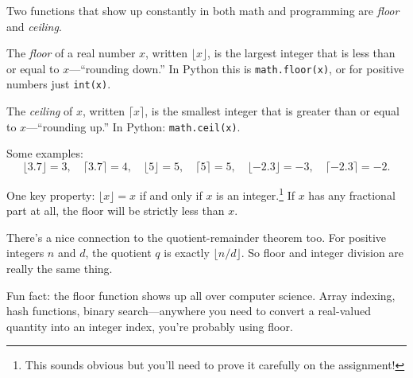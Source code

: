 \documentclass[11pt]{article}
\begin{document}
Two functions that show up constantly in both math and programming are \emph{floor} and \emph{ceiling}.

\begin{definition}
The \emph{floor} of a real number $x$, written $\lfloor x \rfloor$, is the largest integer that is less than or equal to $x$---``rounding down.'' In Python this is \texttt{math.floor(x)}, or for positive numbers just \texttt{int(x)}.

The \emph{ceiling} of $x$, written $\lceil x \rceil$, is the smallest integer that is greater than or equal to $x$---``rounding up.'' In Python: \texttt{math.ceil(x)}.
\end{definition}

Some examples:
\[
  \lfloor 3.7 \rfloor = 3, \quad \lceil 3.7 \rceil = 4, \quad \lfloor 5 \rfloor = 5, \quad \lceil 5 \rceil = 5, \quad \lfloor -2.3 \rfloor = -3, \quad \lceil -2.3 \rceil = -2.
\]

One key property: $\lfloor x \rfloor = x$ if and only if $x$ is an integer.\footnote{This sounds obvious but you'll need to prove it carefully on the assignment!} If $x$ has any fractional part at all, the floor will be strictly less than $x$.

There's a nice connection to the quotient-remainder theorem too. For positive integers $n$ and $d$, the quotient $q$ is exactly $\lfloor n / d \rfloor$. So floor and integer division are really the same thing.

Fun fact: the floor function shows up all over computer science. Array indexing, hash functions, binary search---anywhere you need to convert a real-valued quantity into an integer index, you're probably using floor.
\end{document}
